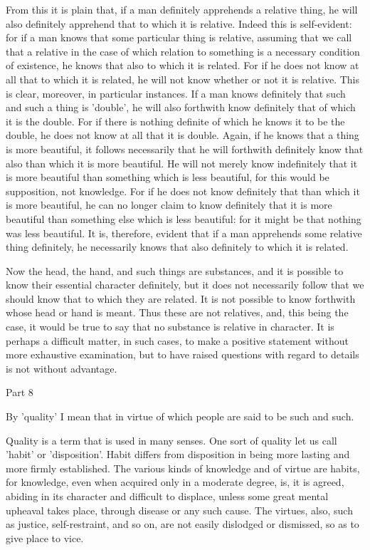 From this it is plain that, if a man definitely apprehends a relative
thing, he will also definitely apprehend that to which it is relative.
Indeed this is self-evident: for if a man knows that some particular
thing is relative, assuming that we call that a relative in the case of
which relation to something is a necessary condition of existence, he
knows that also to which it is related. For if he does not know at all
that to which it is related, he will not know whether or not it is
relative. This is clear, moreover, in particular instances. If a man
knows definitely that such and such a thing is 'double', he will also
forthwith know definitely that of which it is the double. For if there
is nothing definite of which he knows it to be the double, he does not
know at all that it is double. Again, if he knows that a thing is more
beautiful, it follows necessarily that he will forthwith definitely
know that also than which it is more beautiful. He will not merely know
indefinitely that it is more beautiful than something which is less
beautiful, for this would be supposition, not knowledge. For if he does
not know definitely that than which it is more beautiful, he can no
longer claim to know definitely that it is more beautiful than
something else which is less beautiful: for it might be that nothing
was less beautiful. It is, therefore, evident that if a man apprehends
some relative thing definitely, he necessarily knows that also
definitely to which it is related.

Now the head, the hand, and such things are substances, and it is
possible to know their essential character definitely, but it does not
necessarily follow that we should know that to which they are related.
It is not possible to know forthwith whose head or hand is meant. Thus
these are not relatives, and, this being the case, it would be true to
say that no substance is relative in character. It is perhaps a
difficult matter, in such cases, to make a positive statement without
more exhaustive examination, but to have raised questions with regard
to details is not without advantage.



Part 8

By 'quality' I mean that in virtue of which people are said to be such
and such.

Quality is a term that is used in many senses. One sort of quality let
us call 'habit' or 'disposition'. Habit differs from disposition in
being more lasting and more firmly established. The various kinds of
knowledge and of virtue are habits, for knowledge, even when acquired
only in a moderate degree, is, it is agreed, abiding in its character
and difficult to displace, unless some great mental upheaval takes
place, through disease or any such cause. The virtues, also, such as
justice, self-restraint, and so on, are not easily dislodged or
dismissed, so as to give place to vice.


